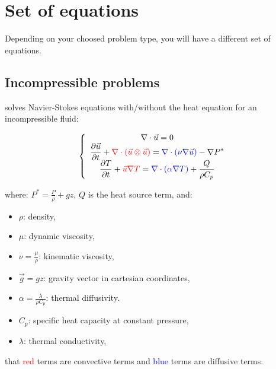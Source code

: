 \section{Set of equations}
Depending on your choosed problem type, you will have a different set of equations.

\subsection{Incompressible problems}
\trust solves Navier-Stokes equations with/without the heat equation for an incompressible fluid:

$$
\left\{
\begin{array}{c}
\nabla \cdot \vec u =0 \\
\displaystyle{\frac{\partial \vec u }{\partial t} + \textcolor{red}{\nabla \cdot (\vec u \otimes \vec u)} = \textcolor{blue}{\nabla \cdot (\nu \nabla \vec u)} - \nabla P^* } \\
\displaystyle{\frac{\partial T}{\partial t} + \textcolor{red}{\vec u \nabla T} = \textcolor{blue}{\nabla \cdot (\alpha \nabla T)} + \frac{Q}{\rho C_p}}
\end{array}
\right.
$$

where: $\displaystyle{P^*=\frac{P}{\rho} + g z}$, $Q$ is the heat source term, and:

\begin{itemize}
\item $\rho$: density,
\item $\mu$: dynamic viscosity,
\item $\displaystyle{\nu=\frac{\mu}{\rho}}$: kinematic viscosity,
\item $\vec g=g z$: gravity vector in cartesian coordinates,
\item $\displaystyle{\alpha=\frac{\lambda}{\rho C_p}}$: thermal diffusivity.
\item $C_p$: specific heat capacity at constant pressure,
\item $\lambda$: thermal conductivity,
\end{itemize}

\Note that \textcolor{red}{red} terms are convective terms and \textcolor{blue}{blue} terms are diffusive terms.\\

